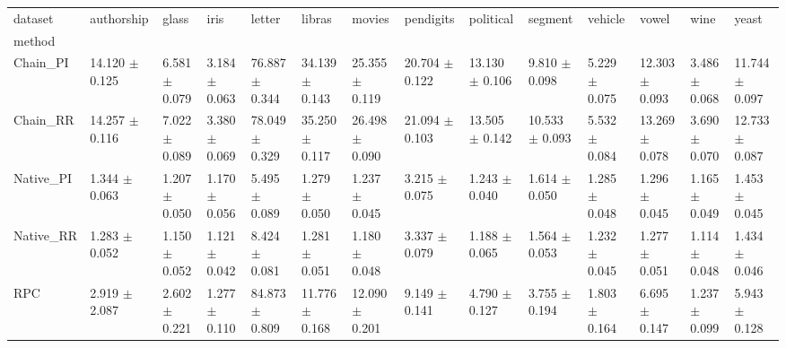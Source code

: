 \begin{tabular}{llllllllllllll}
\toprule
dataset &            authorship &                glass &                 iris &                letter &                libras &                movies &             pendigits &             political &               segment &              vehicle &                 vowel &                 wine &                 yeast \\
method    &                       &                      &                      &                       &                       &                       &                       &                       &                       &                      &                       &                      &                       \\
\midrule
Chain_PI  &  14.120 $ \pm $ 0.125 &  6.581 $ \pm $ 0.079 &  3.184 $ \pm $ 0.063 &  76.887 $ \pm $ 0.344 &  34.139 $ \pm $ 0.143 &  25.355 $ \pm $ 0.119 &  20.704 $ \pm $ 0.122 &  13.130 $ \pm $ 0.106 &   9.810 $ \pm $ 0.098 &  5.229 $ \pm $ 0.075 &  12.303 $ \pm $ 0.093 &  3.486 $ \pm $ 0.068 &  11.744 $ \pm $ 0.097 \\
Chain_RR  &  14.257 $ \pm $ 0.116 &  7.022 $ \pm $ 0.089 &  3.380 $ \pm $ 0.069 &  78.049 $ \pm $ 0.329 &  35.250 $ \pm $ 0.117 &  26.498 $ \pm $ 0.090 &  21.094 $ \pm $ 0.103 &  13.505 $ \pm $ 0.142 &  10.533 $ \pm $ 0.093 &  5.532 $ \pm $ 0.084 &  13.269 $ \pm $ 0.078 &  3.690 $ \pm $ 0.070 &  12.733 $ \pm $ 0.087 \\
Native_PI &   1.344 $ \pm $ 0.063 &  1.207 $ \pm $ 0.050 &  1.170 $ \pm $ 0.056 &   5.495 $ \pm $ 0.089 &   1.279 $ \pm $ 0.050 &   1.237 $ \pm $ 0.045 &   3.215 $ \pm $ 0.075 &   1.243 $ \pm $ 0.040 &   1.614 $ \pm $ 0.050 &  1.285 $ \pm $ 0.048 &   1.296 $ \pm $ 0.045 &  1.165 $ \pm $ 0.049 &   1.453 $ \pm $ 0.045 \\
Native_RR &   1.283 $ \pm $ 0.052 &  1.150 $ \pm $ 0.052 &  1.121 $ \pm $ 0.042 &   8.424 $ \pm $ 0.081 &   1.281 $ \pm $ 0.051 &   1.180 $ \pm $ 0.048 &   3.337 $ \pm $ 0.079 &   1.188 $ \pm $ 0.065 &   1.564 $ \pm $ 0.053 &  1.232 $ \pm $ 0.045 &   1.277 $ \pm $ 0.051 &  1.114 $ \pm $ 0.048 &   1.434 $ \pm $ 0.046 \\
RPC       &   2.919 $ \pm $ 2.087 &  2.602 $ \pm $ 0.221 &  1.277 $ \pm $ 0.110 &  84.873 $ \pm $ 0.809 &  11.776 $ \pm $ 0.168 &  12.090 $ \pm $ 0.201 &   9.149 $ \pm $ 0.141 &   4.790 $ \pm $ 0.127 &   3.755 $ \pm $ 0.194 &  1.803 $ \pm $ 0.164 &   6.695 $ \pm $ 0.147 &  1.237 $ \pm $ 0.099 &   5.943 $ \pm $ 0.128 \\

\end{tabular}
